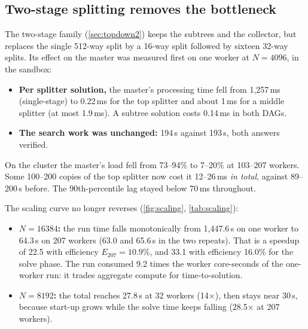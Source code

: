\documentclass[11pt,a4paper]{article}
\begin{document}
\subsection{Two-stage splitting removes the bottleneck}
\label{sec:twostage}
The two-stage family (\cref{sec:topdown2}) keeps the subtrees and the collector, but
replaces the single 512-way split by a 16-way split followed by sixteen 32-way splits. Its
effect on the master was measured first on one worker at $N=4096$, in the sandbox:
\begin{itemize}
\item \textbf{Per splitter solution,} the master's processing time fell from 1{,}257\,ms
      (single-stage) to 0.22\,ms for the top splitter and about 1\,ms for a middle
      splitter (at most 1.9\,ms). A subtree solution costs 0.14\,ms in both DAGs.
\item \textbf{The search work was unchanged:} 194\,s against 193\,s, both answers verified.
\end{itemize}

On the cluster the master's load fell from 73--94\% to 7--20\% at 103--207 workers. Some 100--200
copies of the top splitter now cost it 12--26\,ms \emph{in total}, against 89--200\,s
before. The 90th-percentile lag stayed below 70\,ms throughout.

The scaling curve no longer reverses (\cref{fig:scaling}, \cref{tab:scaling}):
\begin{itemize}
\item \textbf{$N=16384$:} the run time falls monotonically from 1{,}447.6\,s on one worker to
      64.3\,s on 207 workers (63.0 and 65.6\,s in the two repeats). That is a speedup of
      22.5 with efficiency $E_{207}=10.9\%$, and 33.1 with efficiency 16.0\% for the solve
      phase. The run consumed 9.2 times the worker core-seconds of the one-worker run: it
      trades aggregate compute for time-to-solution.
\item \textbf{$N=8192$:} the total reaches 27.8\,s at 32 workers (14$\times$), then stays
      near 30\,s, because start-up grows while the solve time keeps falling (28.5$\times$
      at 207 workers).
\end{itemize}
\end{document}
